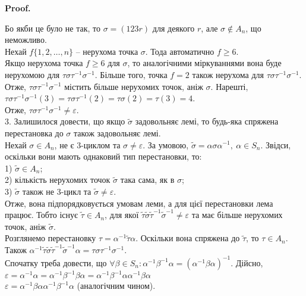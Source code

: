 \documentclass[a4paper, 10pt]{article}
\makeatletter
\theoremstyle{theoremdd}
\theoremstyle{theoremdd}
\theoremstyle{theoremdd}
\theoremstyle{theoremdd}
\theoremstyle{theoremdd}
\theoremstyle{theoremdd}
\theoremstyle{theoremdd}
\theoremstyle{theoremdd}
\theoremstyle{theoremdd}
\theoremstyle{theoremdd}
\theoremstyle{theoremdd}
\theoremstyle{theoremdd}
\theoremstyle{theoremdd}
\theoremstyle{theoremdd}
\theoremstyle{theoremdd}
\renewenvironment{proof}[1][Proof.\\]{\par
\pushQED{\hfill \qed}%
\normalfont \topsep6\p@\@plus6\p@\relax
\trivlist
\item\relax
{\bfseries
#1\@addpunct{.}}\hspace\labelsep\ignorespaces
}{%
\popQED\endtrivlist\@endpefalse
}
\makeatother
\begin{document}
\begin{proof}
Бо якби це було не так, то $\sigma = (123r)$ для деякого $r$, але $\sigma \notin A_n$, що неможливо.\\
Нехай $f \{1,2,\dots,n\}$ -- нерухома точка $\sigma$. Тода автоматично $f \geq 6$.\\
Якщо нерухома точка $f \geq 6$ для $\sigma$, то аналогічними міркуваннями вона буде нерухомою для $\tau \sigma \tau^{-1} \sigma^{-1}$. Більше того, точка $f = 2$ також нерухома для $\tau \sigma \tau^{-1} \sigma^{-1}$. Отже, $\tau \sigma \tau^{-1} \sigma^{-1}$ містить більше нерухомих точок, аніж $\sigma$. Нарешті,\\
$\tau \sigma \tau^{-1} \sigma^{-1}(3) = \tau \sigma \tau^{-1} (2) = \tau \sigma (2) = \tau (3) = 4$.\\
Отже, $\tau \sigma \tau^{-1} \sigma^{-1} \neq \varepsilon$.
\bigskip \\
3. Залишилося довести, що якщо $\tilde{\sigma}$ задовольняє лемі, то будь-яка спряжена перестановка до $\sigma$ також задовольняє лемі.\\
Нехай $\sigma \in A_n$, не є 3-циклом та $\sigma \neq \varepsilon$. За умовою, $\tilde{\sigma} = \alpha \sigma \alpha^{-1},\ \alpha \in S_n$. Звідси, оскільки вони мають однаковий тип перестановки, то:\\
1) $\tilde{\sigma} \in A_n$;\\
2) кількість нерухомих точок $\tilde{\sigma}$ така сама, як в $\sigma$;\\
3) $\tilde{\sigma}$ також не 3-цикл та $\tilde{\sigma} \neq \varepsilon$.\\
Отже, вона підпорядковується умовам леми, а для цієї перестановки лема працює. Тобто існує $\tilde{\tau} \in A_n$, для якої $\tilde{\tau} \tilde{\sigma} \tilde{\tau}^{-1} \tilde{\sigma}^{-1} \neq \varepsilon$ та має більше нерухомих точок, аніж $\tilde{\sigma}$. \\
Розглянемо перестановку $\tau = \alpha^{-1} \tilde{\tau} \alpha$. Оскільки вона спряжена до $\tilde{\tau}$, то $\tau \in A_n$. Також $\alpha^{-1} \tilde{\tau} \tilde{\sigma} \tilde{\tau}^{-1} \tilde{\sigma}^{-1} \alpha = \tau \sigma \tau^{-1} \sigma^{-1}$.\\
Спочатку треба довести, що $\forall \beta \in S_n: \alpha^{-1} \beta^{-1} \alpha = (\alpha^{-1} \beta \alpha)^{-1}$. Дійсно,\\
$\varepsilon = \alpha^{-1} \alpha = \alpha^{-1} \beta^{-1} \beta \alpha = \alpha^{-1} \beta^{-1} \alpha \alpha^{-1} \beta \alpha$\\
$\varepsilon = \alpha^{-1} \beta \alpha \alpha^{-1} \beta^{-1} \alpha$ (аналогічним чином).\\

\end{proof}
\end{document}

